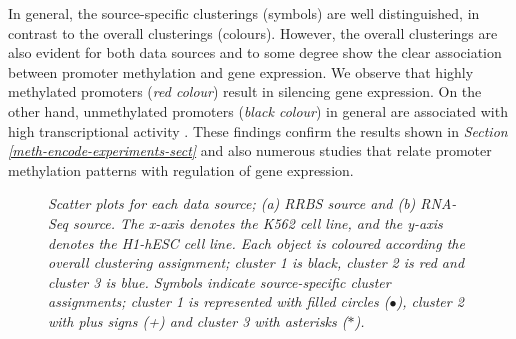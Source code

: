 In general, the source-specific clusterings (\ie symbols) are well distinguished, in contrast to the overall clusterings (\ie colours). However, the overall clusterings are also evident for both data sources and to some degree show the clear association between promoter methylation and gene expression. We observe that highly methylated promoters (\emph{red colour}) result in silencing gene expression. On the other hand, unmethylated promoters (\emph{black colour}) in general are associated with high transcriptional activity \citep{Deaton2011}. These findings confirm the results shown in \emph{Section \ref{meth-encode-experiments-sect}} and also numerous studies that relate promoter methylation patterns with regulation of gene expression. 
\begin{figure}[ht!]
     \begin{center}
    \end{center}
    \caption{\emph{Scatter plots for each data source; (a) RRBS source and (b) RNA-Seq source. The \emph{x-axis} denotes the K562 cell line, and the \emph{y-axis} denotes the H1-hESC cell line. Each object is coloured according the overall clustering assignment; cluster 1 is black, cluster 2 is red and cluster 3 is blue. Symbols indicate source-specific cluster assignments; cluster 1 is represented with filled circles ($\bullet$), cluster 2 with plus signs (+) and cluster 3 with asterisks ($\ast$).}}
   \label{bcc2D-pic}
\end{figure}

